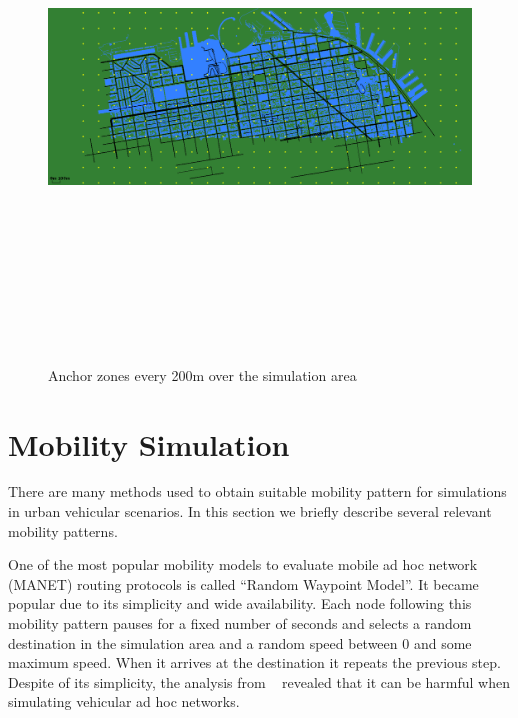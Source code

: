 \begin{figure}[t]
 \centering
 \includegraphics[width=15cm,height=14cm,keepaspectratio]{img/SanFrancisco_Anchors}
 \caption{Anchor zones every 200m over the simulation area}
 \label{fig:anchor_zones_grid}
\end{figure}

\section{Mobility Simulation}

There are many methods used to obtain suitable mobility pattern for simulations
in urban vehicular scenarios. In this section we briefly describe several
relevant mobility patterns.

One of the most popular mobility models to evaluate mobile ad hoc network
(MANET) routing protocols is called ``Random Waypoint Model''. It became popular
due to its simplicity and wide availability. Each node following this mobility
pattern pauses for a fixed number of seconds and selects a random destination
in the simulation area and a random speed between 0 and some maximum speed. When
it arrives at the destination it repeats the previous step. Despite of its
simplicity, the analysis from ~\cite{yoon2003random} revealed that it can be
harmful when simulating vehicular ad hoc networks.

